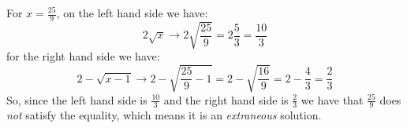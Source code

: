 {        For $x = \frac{25}{9}$, on the left hand side we have:
        \[
            2 \sqrt{x} \rightarrow 2 \sqrt{\frac{25}{9}} = 2 \frac{5}{3} = \frac{10}{3}
        \]
        for the right hand side we have:
        \[
            2 - \sqrt{x - 1} \rightarrow 2 - \sqrt{\frac{25}{9} - 1} = 2 - \sqrt{\frac{16}{9}} = 2 - \frac{4}{3} = \frac{2}{3}
        \]
        So, since the left hand side is $\frac{10}{3}$ and the right hand side is $\frac{2}{3}$ we have that $\frac{25}{9}$ does \textit{not} satisfy the equality, which means it is an \textit{extraneous} solution.
        }%













